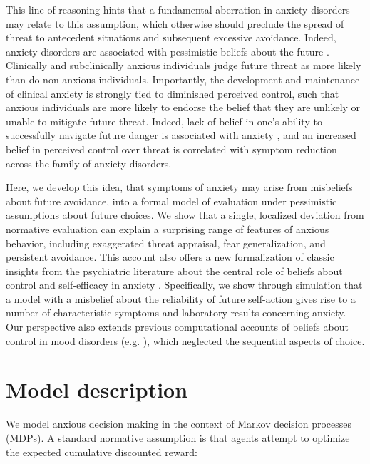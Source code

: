 \documentclass[11pt]{article} %
\begin{document}
This line of reasoning hints that a fundamental aberration in anxiety disorders may relate to this assumption, which otherwise should preclude the spread of threat to antecedent situations and subsequent excessive avoidance. Indeed, anxiety disorders are associated with pessimistic beliefs about the future \citep{ClarkBeck2011}. Clinically and subclinically anxious individuals judge future threat as more likely than do non-anxious individuals\citep{ButlerMathews1983, ButlerMathews1987, MacleodByrne1996}. Importantly, the development and maintenance of clinical anxiety is strongly tied to diminished perceived control\citep{bandura1977, barlow2002, gallagher2014a}, such that anxious individuals are more likely to endorse the belief that they are unlikely or unable to mitigate future threat. Indeed, lack of belief in one's ability to successfully navigate future danger is associated with anxiety \citep{davey1996, dugas1997}, and an increased belief in perceived control over threat is correlated with symptom reduction across the family of anxiety disorders\citep{gallagher2014b}. 

Here, we develop this idea, that symptoms of anxiety may arise from misbeliefs about future avoidance, into a formal model of evaluation under pessimistic assumptions about future choices. We show that a single, localized deviation from normative evaluation can explain a surprising range of features of anxious behavior, including exaggerated threat appraisal, fear generalization, and persistent avoidance. This account also offers a new formalization of classic insights from the psychiatric literature about the central role of beliefs about control and self-efficacy in anxiety \citep{bandura1977, barlow2002}. Specifically, we show through simulation that a model with a misbelief about the reliability of future self-action gives rise to a number of characteristic symptoms and laboratory results concerning anxiety. Our perspective also extends previous computational accounts of beliefs about control in mood disorders (e.g. \cite{HuysDayan2009}), which neglected the sequential aspects of choice.

\section{Model description}

We model anxious decision making in the context of Markov decision processes (MDPs). A standard normative assumption is that agents attempt to optimize the expected cumulative discounted reward:
\end{document}
